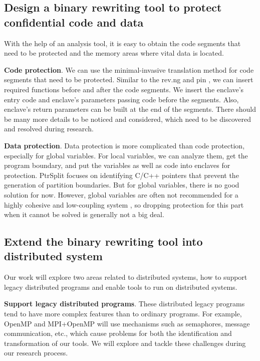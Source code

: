 \subsection{Design a binary rewriting tool to protect confidential code and data}
\label{sec:ToolToRewrite}
With the help of an analysis tool, it is easy to obtain the code segments that need
to be protected and the memory areas where vital data is located.

\textbf{Code protection}. We can use the minimal-invasive translation method for
code segments that need to be protected. Similar to the rev.ng \cite{Federico2017revngAU}
and pin \cite{Luk2005PinBC}, we can insert required functions before and
after the code segments. We insert the enclave's entry code and enclave's parameters passing code
before the segments. Also, enclave's return parameters can be built at the end of the segments.
There should be many more details to be noticed and considered, which need to be
discovered and resolved during research.

\textbf{Data protection}. Data protection is more complicated than code protection,
especially for global variables.
For local variables, we can analyze them, get the program boundary,
and put the variables as well as code into enclaves for protection.
PtrSplit \cite{Liu2017PtrSplitSG} focuses on identifying C/C++ pointers
that prevent the generation of partition boundaries.
But for global variables, there is no good solution for now. However,
global variables are often not recommended for a highly cohesive and low-coupling system
\cite{GlobalVariablesAreBad, GlobalVariablesAreEvil},
so dropping protection for this part when it cannot be solved is generally not a big deal.

\subsection{Extend the binary rewriting tool into distributed system}
\label{sec:ToolToDistributedSystem}
Our work will explore two areas related to distributed systems, how to support legacy distributed
programs and enable tools to run on distributed systems.

\textbf{Support legacy distributed programs}.
These distributed legacy programs tend to have more complex features
than to ordinary programs.
For example, OpenMP \cite{Dagum1998OpenMPAI} and MPI+OpenMP \cite{Klinkenberg2020CHAMELEONRL}
will use mechanisms such as semaphores, message communication, etc., which cause problems
for both the identification and transformation of our tools.
We will explore and tackle these challenges during our research process.

